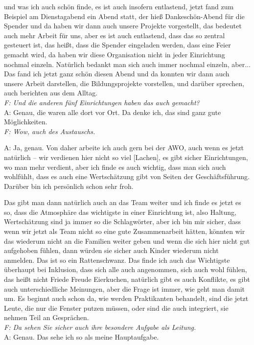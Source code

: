 \begin{linenumbers*}
und was ich auch schön finde, es ist auch insofern entlastend, jetzt fand zum Beispiel am Dienstagabend ein Abend statt, der hieß Dankeschön-Abend für die Spender und da haben wir dann auch unsere Projekte vorgestellt, das bedeutet auch mehr Arbeit für uns, aber es ist auch entlastend, dass das so zentral gesteuert ist, das heißt, dass die Spender eingeladen werden, dass eine Feier gemacht wird, da haben wir diese Organisation nicht in jeder Einrichtung nochmal einzeln. Natürlich bedankt man sich auch immer nochmal einzeln, aber... Das fand ich jetzt ganz schön diesen Abend und da konnten wir dann auch unsere Arbeit darstellen, die Bildungsprojekte vorstellen, und darüber sprechen, auch berichten aus dem Alltag.\\
\emph{F: Und die anderen fünf Einrichtungen haben das auch gemacht?}\\
A: Genau, die waren alle dort vor Ort. Da denke ich, das sind ganz gute Möglichkeiten.\\
\emph{F: Wow, auch des Austauschs.}

A: Ja, genau. Von daher arbeite ich auch gern bei der AWO, auch wenn es jetzt natürlich -- wir verdienen hier nicht so viel {[Lachen]}, es gibt sicher Einrichtungen, wo man mehr verdient, aber ich finde es auch wichtig, dass man sich auch wohlfühlt, dass es auch eine Wertschätzung gibt von Seiten der Geschäftsführung. Darüber bin ich persönlich schon sehr froh. 

Das gibt man dann natürlich auch an das Team weiter und ich finde es jetzt es so, dass die Atmosphäre das wichtigste in einer Einrichtung ist, also Haltung, Wertschätzung sind ja immer so die Schlagwörter, aber ich bin mir sicher, dass wenn wir jetzt als Team nicht so eine gute Zusammenarbeit hätten, könnten wir das wiederum nicht an die Familien weiter geben und wenn die sich hier nicht gut aufgehoben fühlen, dann würden sie sicher auch Kinder wiederum nicht anmelden. Das ist so ein Rattenschwanz. 
Das finde ich auch das Wichtigste überhaupt bei Inklusion, dass sich alle auch angenommen, sich auch wohl fühlen, das heißt nicht Friede Freude Eierkuchen, natürlich gibt es auch Konflikte, es gibt auch unterschiedliche Meinungen, aber die Frage ist immer, wie geht man damit um. Es beginnt auch schon da, wie werden Praktikanten behandelt, sind die jetzt Leute, die nur die Fenster putzen müssen, oder sind die auch integriert, sie nehmen Teil an Gesprächen.\\
\emph{F: Da sehen Sie sicher auch ihre besondere Aufgabe als Leitung.}\\
A: Genau. Das sehe ich so als meine Hauptaufgabe. 


\end{linenumbers*}
